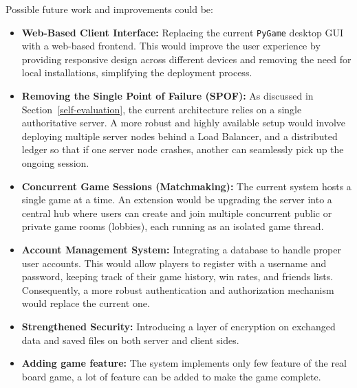 \documentclass{scrartcl}
\begin{document}
Possible future work and improvements could be:
\begin{itemize}
    \item \textbf{Web-Based Client Interface:} Replacing the current \texttt{PyGame} desktop GUI with a web-based frontend.
    This would improve the user experience by providing responsive design across different devices
    and removing the need for local installations, simplifying the deployment process.
    \item \textbf{Removing the Single Point of Failure (SPOF):} As discussed in Section~\ref{self-evaluation},
    the current architecture relies on a single authoritative server.
    A more robust and highly available setup would involve deploying multiple server nodes behind a Load Balancer,
    and a distributed ledger so that if one server node crashes, another can seamlessly pick up the ongoing session.
    \item \textbf{Concurrent Game Sessions (Matchmaking):} The current system hosts a single game at a time.
    An extension would be upgrading the server into a central hub where users can create and join multiple concurrent
    public or private game rooms (lobbies), each running as an isolated game thread.
    \item \textbf{Account Management System:} Integrating a database to handle proper user accounts.
    This would allow players to register with a username and password, keeping track of their game history, win rates, and friends lists.
    Consequently, a more robust authentication and authorization mechanism would replace the current one.
    \item \textbf{Strengthened Security:} Introducing a layer of encryption on exchanged data and saved files on both server and client sides.
    \item \textbf{Adding game feature:} The system implements only few feature of the real board game, a lot of feature can be added to make the game complete.
\end{itemize}
\end{document}
